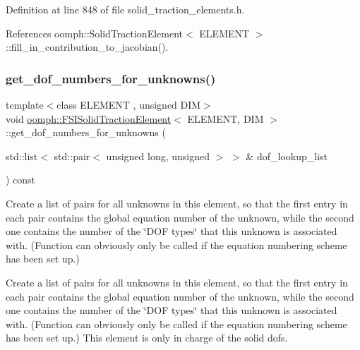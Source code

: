 Definition at line 848 of file solid\+\_\+traction\+\_\+elements.\+h.



References oomph\+::\+Solid\+Traction\+Element$<$ E\+L\+E\+M\+E\+N\+T $>$\+::fill\+\_\+in\+\_\+contribution\+\_\+to\+\_\+jacobian().

\mbox{\label{classoomph_1_1FSISolidTractionElement_a9adce8a7e39bba43c3a231f970d82785}} 
\subsubsection{\texorpdfstring{get\+\_\+dof\+\_\+numbers\+\_\+for\+\_\+unknowns()}{get\_dof\_numbers\_for\_unknowns()}}
{\footnotesize\ttfamily template$<$class E\+L\+E\+M\+E\+NT , unsigned D\+IM$>$ \\
void \hyperlink{classoomph_1_1FSISolidTractionElement}{oomph\+::\+F\+S\+I\+Solid\+Traction\+Element}$<$ E\+L\+E\+M\+E\+NT, D\+IM $>$\+::get\+\_\+dof\+\_\+numbers\+\_\+for\+\_\+unknowns (\begin{DoxyParamCaption}\item[{std\+::list$<$ std\+::pair$<$ unsigned long, unsigned $>$ $>$ \&}]{dof\+\_\+lookup\+\_\+list }\end{DoxyParamCaption}) const\hspace{0.3cm}{\ttfamily [virtual]}}



Create a list of pairs for all unknowns in this element, so that the first entry in each pair contains the global equation number of the unknown, while the second one contains the number of the \char`\"{}\+D\+O\+F types\char`\"{} that this unknown is associated with. (Function can obviously only be called if the equation numbering scheme has been set up.) 

Create a list of pairs for all unknowns in this element, so that the first entry in each pair contains the global equation number of the unknown, while the second one contains the number of the \char`\"{}\+D\+O\+F types\char`\"{} that this unknown is associated with. (Function can obviously only be called if the equation numbering scheme has been set up.) This element is only in charge of the solid dofs. 

